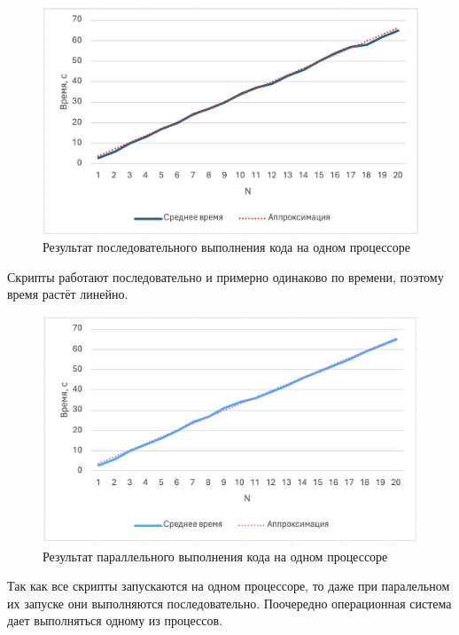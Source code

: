 \documentclass{article}
\begin{document}
\begin{figure}[H]
\centering
\includegraphics[width=1\textwidth]{images/5.png}
\caption{Результат последовательного выполнения кода на одном процессоре}
\end{figure}

Скрипты работают последовательно и примерно одинаково по времени, поэтому время растёт линейно.

\begin{figure}[H]
\centering
\includegraphics[width=1\textwidth]{images/6.png}
\caption{Результат параллельного выполнения кода на одном процессоре}
\end{figure}

Так как все скрипты запускаются на одном процессоре, то даже при паралельном их запуске они выполняются последовательно. Поочередно операционная система дает выполняться одному из процессов.
\end{document}
